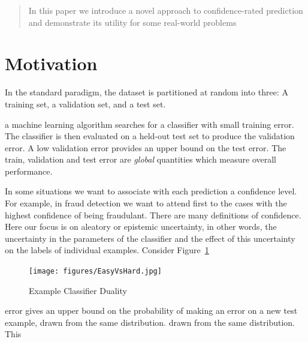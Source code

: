 \documentclass{article}
\begin{document}
\printAffiliationsAndNotice{\icmlEqualContribution} %

\begin{abstract}
In this paper we introduce a novel approach to confidence-rated
prediction and demonstrate its utility for some real-world problems
\end{abstract}

\newcommand{\cC}{{\cal C}}
\newcommand{\cD}{{\cal D}}
\newcommand{\cT}{{\cal T}}
\newcommand{\cN}{{\cal N}}
\newcommand{\cA}{{\cal A}}
\newcommand{\cE}{{\cal E}}
\newcommand{\cF}{{\cal F}}
\newcommand{\cX}{{\cal X}}
\newcommand{\cY}{{\cal Y}}
\renewcommand{\Pr}[2]{\mbox{Pr}_{#1}\left[ #2 \right]}

\section{Motivation}
\label{sec:Motivation}

In the standard paradigm, the dataset is partitioned at random into
three: A training set, a validation set, and a test set. 

a machine learning algorithm searches for a
classifier with small training error. The classifier is then evaluated
on a held-out test set to produce the validation error. 
A low validation error provides an upper bound on the test error.
The train, validation and test error are {\em global} quantities which
measure overall performance.

In some situations we want to associate with each prediction a
confidence level. For example, in fraud detection we want to attend
first to the cases with the highest confidence of being fraudulant.
There are many definitions of confidence. Here our focus is on
aleatory or epistemic uncertainty, in other words, the uncertainty in
the parameters of the classifier and the effect of this uncertainty on
the labels of individual examples. Consider Figure~\ref{fig:duality} 

\begin{figure}[h]
\begin{center}
\texttt{[image: figures/EasyVsHard.jpg]}
\end{center}
\caption{Example Classifier Duality}
\label{fig:duality}
\end{figure}

error gives an upper bound on the probability of making an
error on a new test example, drawn from the same distribution.
drawn from the same distribution. This 
\end{document}
